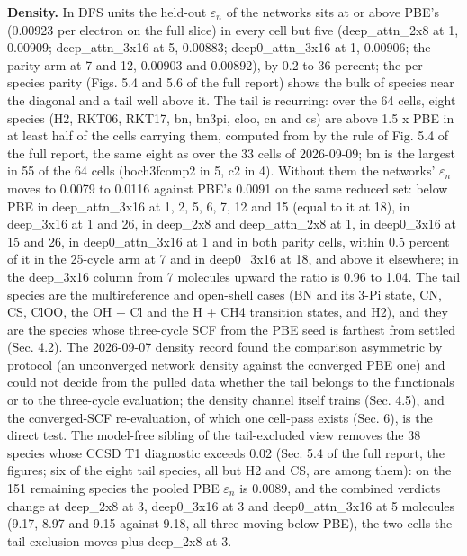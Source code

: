 \documentclass[10pt,a4paper]{article}
\begin{document}
\textbf{Density.} In DFS units the held-out $\varepsilon_n$ of the networks sits at or above PBE's (0.00923 per electron on the full slice) in every cell but five (deep\_attn\_2x8 at 1, 0.00909; deep\_attn\_3x16 at 5, 0.00883; deep0\_attn\_3x16 at 1, 0.00906; the parity arm at 7 and 12, 0.00903 and 0.00892), by 0.2 to 36 percent; the per-species parity (Figs. 5.4 and 5.6 of the full report) shows the bulk of species near the diagonal and a tail well above it. The tail is recurring: over the 64 cells, eight species (H2, RKT06, RKT17, bn, bn3pi, cloo, cn and cs) are above 1.5 x PBE in at least half of the cells carrying them, computed from  by the rule of Fig. 5.4 of the full report, the same eight as over the 33 cells of 2026-09-09; bn is the largest in 55 of the 64 cells (hoch3fcomp2 in 5, c2 in 4). Without them the networks' $\varepsilon_n$ moves to 0.0079 to 0.0116 against PBE's 0.0091 on the same reduced set: below PBE in deep\_attn\_3x16 at 1, 2, 5, 6, 7, 12 and 15 (equal to it at 18), in deep\_3x16 at 1 and 26, in deep\_2x8 and deep\_attn\_2x8 at 1, in deep0\_3x16 at 15 and 26, in deep0\_attn\_3x16 at 1 and in both parity cells, within 0.5 percent of it in the 25-cycle arm at 7 and in deep0\_3x16 at 18, and above it elsewhere; in the deep\_3x16 column from 7 molecules upward the ratio is 0.96 to 1.04. The tail species are the multireference and open-shell cases (BN and its 3-Pi state, CN, CS, ClOO, the OH + Cl and the H + CH4 transition states, and H2), and they are the species whose three-cycle SCF from the PBE seed is farthest from settled (Sec. 4.2). The 2026-09-07 density record found the comparison asymmetric by protocol (an unconverged network density against the converged PBE one) and could not decide from the pulled data whether the tail belongs to the functionals or to the three-cycle evaluation; the density channel itself trains (Sec. 4.5), and the converged-SCF re-evaluation, of which one cell-pass exists (Sec. 6), is the direct test. The model-free sibling of the tail-excluded view removes the 38 species whose CCSD T1 diagnostic exceeds 0.02 (Sec. 5.4 of the full report, the  figures; six of the eight tail species, all but H2 and CS, are among them): on the 151 remaining species the pooled PBE $\varepsilon_n$ is 0.0089, and the combined verdicts change at deep\_2x8 at 3, deep0\_3x16 at 3 and deep0\_attn\_3x16 at 5 molecules (9.17, 8.97 and 9.15 against 9.18, all three moving below PBE), the two cells the tail exclusion moves plus deep\_2x8 at 3.
\end{document}
